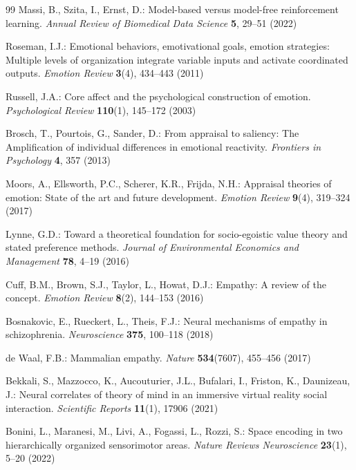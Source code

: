 \documentclass[runningheads]{llncs}
\begin{document}
\begin{thebibliography}{99}
Massi, B., Szita, I., Ernst, D.: Model-based versus model-free reinforcement learning. \textit{Annual Review of Biomedical Data Science} \textbf{5}, 29--51 (2022)

Roseman, I.J.: Emotional behaviors, emotivational goals, emotion strategies: Multiple levels of organization integrate variable inputs and activate coordinated outputs. \textit{Emotion Review} \textbf{3}(4), 434--443 (2011)

Russell, J.A.: Core affect and the psychological construction of emotion. \textit{Psychological Review} \textbf{110}(1), 145--172 (2003)

Brosch, T., Pourtois, G., Sander, D.: From appraisal to saliency: The Amplification of individual differences in emotional reactivity. \textit{Frontiers in Psychology} \textbf{4}, 357 (2013)

Moors, A., Ellsworth, P.C., Scherer, K.R., Frijda, N.H.: Appraisal theories of emotion: State of the art and future development. \textit{Emotion Review} \textbf{9}(4), 319--324 (2017)

Lynne, G.D.: Toward a theoretical foundation for socio-egoistic value theory and stated preference methods. \textit{Journal of Environmental Economics and Management} \textbf{78}, 4--19 (2016)

Cuff, B.M., Brown, S.J., Taylor, L., Howat, D.J.: Empathy: A review of the concept. \textit{Emotion Review} \textbf{8}(2), 144--153 (2016)

Bosnakovic, E., Rueckert, L., Theis, F.J.: Neural mechanisms of empathy in schizophrenia. \textit{Neuroscience} \textbf{375}, 100--118 (2018)

de Waal, F.B.: Mammalian empathy. \textit{Nature} \textbf{534}(7607), 455--456 (2017)

Bekkali, S., Mazzocco, K., Aucouturier, J.L., Bufalari, I., Friston, K., Daunizeau, J.: Neural correlates of theory of mind in an immersive virtual reality social interaction. \textit{Scientific Reports} \textbf{11}(1), 17906 (2021)

Bonini, L., Maranesi, M., Livi, A., Fogassi, L., Rozzi, S.: Space encoding in two hierarchically organized sensorimotor areas. \textit{Nature Reviews Neuroscience} \textbf{23}(1), 5--20 (2022)


\end{thebibliography}
\end{document}

